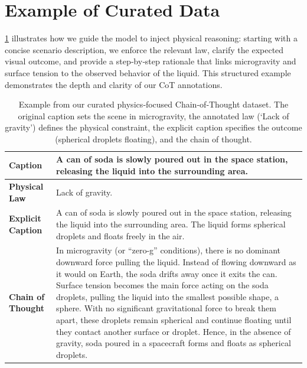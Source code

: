 \clearpage
\setcounter{page}{1}
\maketitlesupplementary


\section{Example of Curated Data}
\cref{tab:cot-example} illustrates how we guide the model to inject physical reasoning: starting with a concise scenario description, we enforce the relevant law, clarify the expected visual outcome, and provide a step‐by‐step rationale that links microgravity and surface tension to the observed behavior of the liquid. This structured example demonstrates the depth and clarity of our CoT annotations.
\begin{table}[h]
  \caption{Example from our curated physics‐focused Chain‐of‐Thought dataset. The original caption sets the scene in microgravity, the annotated law (‘Lack of gravity’) defines the physical constraint, the explicit caption specifies the outcome (spherical droplets floating), and the chain of thought.}
  \centering
  \begin{tabular}{@{}p{3cm}p{10cm}@{}}
    \toprule
    \textbf{Caption} & A can of soda is slowly poured out in the space station, releasing the liquid into the surrounding area. \\
    \midrule
    \textbf{Physical Law} & Lack of gravity. \\
    \midrule
    \textbf{Explicit Caption} & A can of soda is slowly poured out in the space station, releasing the liquid into the surrounding area. The liquid forms spherical droplets and floats freely in the air. \\
    \midrule
    \textbf{Chain of Thought} & In microgravity (or “zero-g” conditions), there is no dominant downward force pulling the liquid. Instead of flowing downward as it would on Earth, the soda drifts away once it exits the can. Surface tension becomes the main force acting on the soda droplets, pulling the liquid into the smallest possible shape, a sphere. With no significant gravitational force to break them apart, these droplets remain spherical and continue floating until they contact another surface or droplet. Hence, in the absence of gravity, soda poured in a spacecraft forms and floats as spherical droplets. \\
    \bottomrule
  \end{tabular}
  \label{tab:cot-example}
\end{table}


